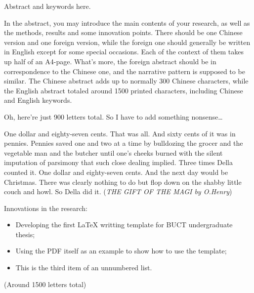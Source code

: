 \begin{abstracten}
	Abstract and keywords here.
	
	In the abstract, you may introduce the main contents of your research, as well as the methods, results and some innovation points. There should be one Chinese version and one foreign version, while the foreign one should generally be written in English except for some special occasions. Each of the context of them takes up half of an A4-page. What's more, the foreign abstract should be in correspondence to the Chinese one, and the narrative pattern is supposed to be similar. The Chinese abstract adds up to normally 300 Chinese characters, while the English abstract totaled around 1500 printed characters, including Chinese and English keywords.

	Oh, here're just 900 letters total. So I have to add something nonsense\dots 

	One dollar and eighty-seven cents. That was all. And sixty cents of it was in pennies. Pennies saved one and two at a time by bulldozing the grocer and the vegetable man and the butcher until one's cheeks burned with the silent imputation of parsimony that such close dealing implied. Three times Della counted it. One dollar and eighty-seven cents. And the next day would be Christmas. There was clearly nothing to do but flop down on the shabby little couch and howl. So Della did it. (\textit{THE GIFT OF THE MAGI by O.Henry})
	
	Innovations in the research:
	\begin{itemize}
		\item Developing the first \LaTeX{} writting template for BUCT undergraduate thesis;
		\item Using the PDF itself as an example to show how to use the template;
		\item This is the third item of an unnumbered list.
	\end{itemize}

	(Around 1500 letters total)
\end{abstracten}